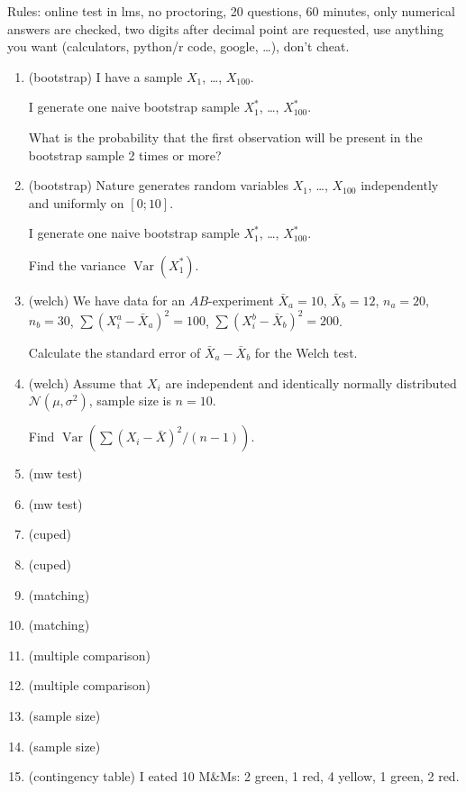 \documentclass[12pt]{article}
\DeclareMathOperator{\Var}{Var}
\newcommand{\cN}{\mathcal{N}}
\begin{document}
Rules: online test in lms, no proctoring, 20 questions, 60 minutes, only numerical answers are checked, 
two digits after decimal point are requested, 
use anything you want (calculators, python/r code, google, \ldots), don't cheat. 


\begin{enumerate}
    \item (bootstrap) I have a sample $X_1$, \ldots, $X_{100}$.
    
    I generate one naive bootstrap sample $X_1^*$, \ldots, $X_{100}^*$. 

    What is the probability that the first observation will be present in the bootstrap sample 2 times or more?

    \item (bootstrap) Nature generates random variables $X_1$, \ldots, $X_{100}$ independently and uniformly on $[0;10]$.
    
    I generate one naive bootstrap sample $X_1^*$, \ldots, $X_{100}^*$. 

    Find the variance $\Var(X_1^*)$.
    \item (welch) We have data for an $AB$-experiment $\bar X_a = 10$, $\bar X_b = 12$, 
    $n_a = 20$, $n_b = 30$, $\sum (X_i^a - \bar X_a)^2 = 100$, $\sum (X_i^b - \bar X_b)^2 = 200$.

    Calculate the standard error of $\bar X_a - \bar X_b$ for the Welch test. 

    \item (welch) Assume that $X_i$ are independent and identically normally distributed $\cN(\mu, \sigma^2)$, 
    sample size is $n=10$. 
    
    Find $\Var(\sum (X_i - \bar X)^2 / (n - 1))$.
    
    \item (mw test)
    \item (mw test)
    \item (cuped)
    \item (cuped)
    \item (matching)
    \item (matching)
    \item (multiple comparison)
    \item (multiple comparison)
    \item (sample size)
    \item (sample size)
    \item (contingency table) I eated 10 M\&Ms: 2 green, 1 red, 4 yellow, 1 green, 2 red.  
    

\end{enumerate}
\end{document}
